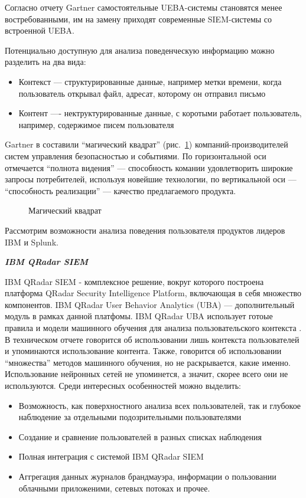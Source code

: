 Согласно отчету Gartner\cite{gartner} самостоятельные UEBA-системы становятся менее востребованными, им на замену приходят современные SIEM-системы со встроенной UEBA.

Потенциально доступную для анализа поведенческую информацию можно разделить на два вида:
\begin{itemize}
\item Контекст --- структурированные данные, например метки времени, когда пользователь открывал файл, адресат, которому он отправил письмо
\item Контент ---- нектруктурированные данные, с коротыми  работает пользователь, например, содержимое писем пользователя
\end{itemize}

Gartner в \cite{gartner2} составили ``магический квадрат'' (рис.~\ref{fig:magic_quad}) компаний-производителей систем управления безопасностью и событиями. По горизонтальной оси отмечается ``полнота видения'' --- способность комании удовлетворить широкие запросы потребителей, используя новейшие технологии, по вертикальной оси --- ``способность реализации'' --- качество предлагаемого продукта.
\begin{figure}[h!]
\caption{Магический квадрат\cite{gartner2}}
\label{fig:magic_quad}
\end{figure}

Рассмотрим возможности анализа поведения пользователя продуктов лидеров IBM и Splunk.

\textbf{\textit{IBM QRadar SIEM}}

IBM QRadar SIEM - комплексное решение, вокруг которого построена платформа QRadar Security Intelligence Platform, включающая в себя множество компонентов. IBM QRadar User Behavior Analytics (UBA)\cite{ibm_uba} --- дополнительный модуль в рамках данной платфомы. IBM QRadar UBA использует готоые правила и модели машинного обучения для анализа пользовательского контекста\cite{ibm_uba} . В техническом отчете\cite{ibm_tech} говорится об использовании лишь контекста пользователей и упоминаются использование контента. Также, говорится об использовании ``множества'' методов машинного обучения, но не раскрывается, какие именно. Использование нейронных сетей не упоминется, а значит, скорее всего они не используются. Среди интересных особенностей можно выделить:
\begin{itemize}
\item Возможность, как поверхностного анализа всех пользователей, так и глубокое наблюдение за отдельными подозрительными пользователями
\item Создание и сравнение пользователей в разных списках наблюдения
\item Полная интеграция с системой IBM QRadar SIEM
\item Аггрегация данных журналов брандмауэра, информации о пользовании облачными приложеними, сетевых потоках и прочее.
\end{itemize}

